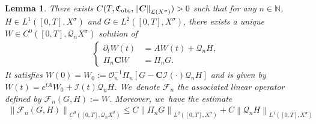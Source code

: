 \documentclass[JEP,XML,SOM,Unicode,published]{cedram}
\newtheorem{lemma}[theorem]{Lemma}
\theoremstyle{definition}
\let\mc\mathcal
\renewcommand{\O}{\mc{O}}
\newcommand{\N}{\mathbb{N}}
\newcommand{\Q}{\mathcal{Q}}
\newcommand{\bC}{\boldsymbol{C}}
\newcommand\nor[2]{\left\|#1\right\|_{#2}}
\newcommand\FL{\mathcal{F}_{n}}
\begin{document}
\begin{lemma}
\label{lmCauchyobs}
There exists $C(T,\mathfrak{C}_{\textup{obs}},\nor{\bC}{\mc{L}(X^\sigma)})>0$ such that for any $n\in\N$, $H\in L^{1}([0,T],X^{\sigma})$ and $G\in L^{2}([0,T],X^{\sigma})$, there exists a unique $W\in C^{0}([0,T],\Q_{n}X^{\sigma})$ solution of
\begin{align}\label{solprojectlin}
\left\{\begin{array}{rl}
\partial_t W(t)&=AW(t)+\Q_{n}H, \\[3pt]
\Pi_n\bC W &=\Pi_{n}G.
\end{array}\right.
\end{align}
It satisfies $W(0)= W_0:=\O_n^{-1}\Pi_n\left[G-\bC\mc{I}(\cdot)\Q_n H\right]$ and is given by $W(t)=e^{tA}W_{0}+\mc{I}(t)\Q_nH$. We~denote $\FL$ the associated linear operator defined by $\FL(G,H):=W$. Moreover, we~have the estimate
\begin{align}
\label{estimFL}
\nor{\FL(G,H)}{C^{0}([0,T],\Q_{n}X^{\sigma})}\leq C \nor{\Pi_{n}G}{L^{2}([0,T],X^{\sigma})}+C\nor{\Q_{n} H}{L^{1}([0,T],X^{\sigma})}
\end{align}
\end{lemma}
\end{document}
